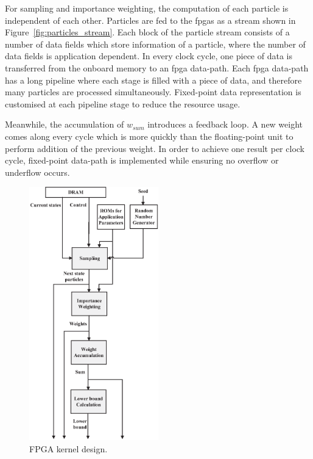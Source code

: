 For sampling and importance weighting, the computation of each particle is independent of each other.
Particles are fed to the \glspl{fpga} as a stream shown in Figure~\ref{fig:particles_stream}.
Each block of the particle stream consists of a number of data fields which store information of a particle, where the number of data fields is application dependent.
In every clock cycle, one piece of data is transferred from the onboard memory to an \gls{fpga} data-path.
Each \gls{fpga} data-path has a long pipeline where each stage is filled with a piece of data, and therefore many particles are processed simultaneously.
Fixed-point data representation is customised at each pipeline stage to reduce the resource usage.

Meanwhile, the accumulation of $w_{sum}$ introduces a feedback loop.
A new weight comes along every cycle which is more quickly than the floating-point unit to perform addition of the previous weight.
In order to achieve one result per clock cycle, fixed-point data-path is implemented while ensuring no overflow or underflow occurs.

\begin{figure}[t!]
\centering
\includegraphics[width=0.5\textwidth]{4_adaptation/figures/fig_kernel}
\caption{FPGA kernel design.}
\label{fig:reconfig_kernel}
\end{figure}

